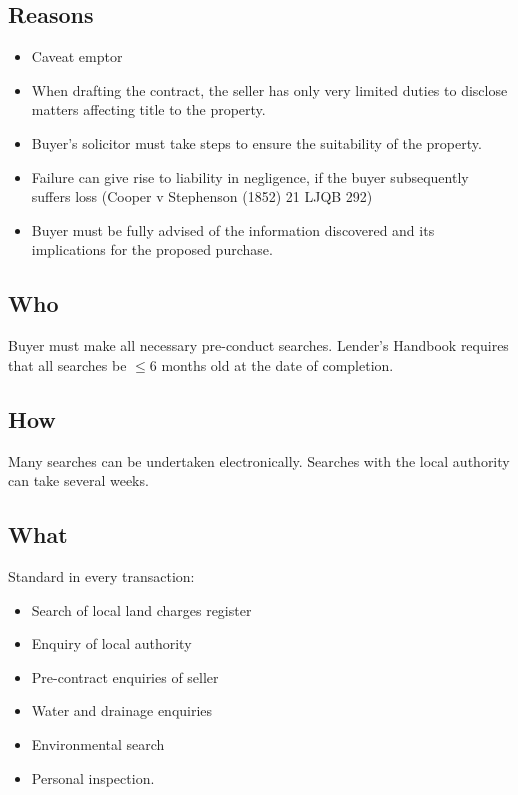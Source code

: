 \documentclass[
]{article}
\providecommand{\tightlist}{%
  \setlength{\itemsep}{0pt}\setlength{\parskip}{0pt}}
\begin{document}
\hypertarget{reasons}{%
\subsection{Reasons}\label{reasons}}

\begin{itemize}
\tightlist
\item
  Caveat emptor
\item
  When drafting the contract, the seller has only very limited duties to
  disclose matters affecting title to the property.
\item
  Buyer's solicitor must take steps to ensure the suitability of the
  property.
\item
  Failure can give rise to liability in negligence, if the buyer
  subsequently suffers loss (Cooper v Stephenson (1852) 21 LJQB 292)
\item
  Buyer must be fully advised of the information discovered and its
  implications for the proposed purchase.
\end{itemize}

\hypertarget{who}{%
\subsection{Who}\label{who}}

Buyer must make all necessary pre-conduct searches. Lender's Handbook
requires that all searches be {\(\leq 6\)} months old at the date of
completion.

\hypertarget{how}{%
\subsection{How}\label{how}}

Many searches can be undertaken electronically. Searches with the local
authority can take several weeks.

\hypertarget{what}{%
\subsection{What}\label{what}}

Standard in every transaction:

\begin{itemize}
\tightlist
\item
  Search of local land charges register
\item
  Enquiry of local authority
\item
  Pre-contract enquiries of seller
\item
  Water and drainage enquiries
\item
  Environmental search
\item
  Personal inspection.
\end{itemize}
\end{document}
